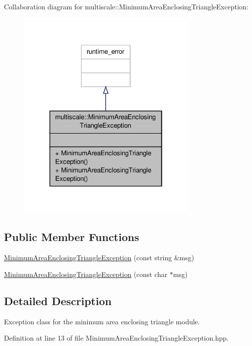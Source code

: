 Collaboration diagram for multiscale\-:\-:Minimum\-Area\-Enclosing\-Triangle\-Exception\-:\nopagebreak
\begin{figure}[H]
\begin{center}
\leavevmode
\includegraphics[width=250pt]{classmultiscale_1_1MinimumAreaEnclosingTriangleException__coll__graph}
\end{center}
\end{figure}
\subsection*{Public Member Functions}
\begin{DoxyCompactItemize}
\item 
\hyperlink{classmultiscale_1_1MinimumAreaEnclosingTriangleException_ab3b5f7915eed59446a1bf15d8408ffaa}{Minimum\-Area\-Enclosing\-Triangle\-Exception} (const string \&msg)
\item 
\hyperlink{classmultiscale_1_1MinimumAreaEnclosingTriangleException_aa2d98ad9b3ef5599405d176b20affe55}{Minimum\-Area\-Enclosing\-Triangle\-Exception} (const char $\ast$msg)
\end{DoxyCompactItemize}


\subsection{Detailed Description}
Exception class for the minimum area enclosing triangle module. 

Definition at line 13 of file Minimum\-Area\-Enclosing\-Triangle\-Exception.\-hpp.




